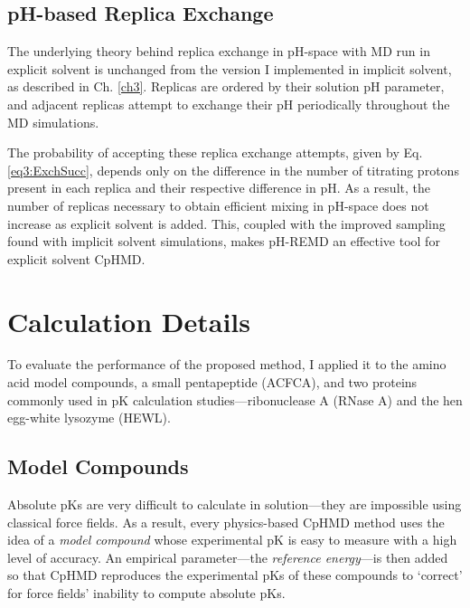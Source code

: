 \subsection{pH-based Replica Exchange}

The underlying theory behind replica exchange in pH-space with MD run in
explicit solvent is unchanged from the version I implemented in implicit
solvent, as described in Ch. \ref{ch3}.
\cite{Swails_JChemTheoryComput_2012_v8_p4393, Itoh_Proteins_2011_v79_p3420}
Replicas are ordered by their solution pH parameter, and adjacent replicas
attempt to exchange their pH periodically throughout the MD simulations.

The probability of accepting these replica exchange attempts, given by
Eq. \ref{eq3:ExchSucc}, depends only on the difference in the number of
titrating protons present in each replica and their respective difference in pH.
\cite{Swails_JChemTheoryComput_2012_v8_p4393} As a result, the number of
replicas necessary to obtain efficient mixing in pH-space does not increase as
explicit solvent is added. This, coupled with the improved sampling found with
implicit solvent simulations, \cite{Swails_JChemTheoryComput_2012_v8_p4393}
makes pH-REMD an effective tool for explicit solvent CpHMD.

\section{Calculation Details}

To evaluate the performance of the proposed method, I applied it to the amino
acid model compounds, a small pentapeptide (ACFCA), and two proteins commonly
used in pK calculation studies---ribonuclease A (RNase A) and the hen
egg-white lysozyme (HEWL).

\subsection{Model Compounds}

Absolute pKs are very difficult to calculate in solution---they are
impossible using classical force fields. As a result, every physics-based CpHMD
method uses the idea of a \emph{model compound} whose experimental pK is
easy to measure with a high level of accuracy. An empirical parameter---the
\emph{reference energy}---is then added so that CpHMD reproduces the
experimental pKs of these compounds to `correct' for force fields'
inability to compute absolute pKs.

